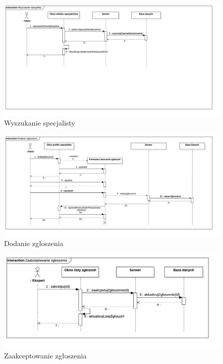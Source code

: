 \documentclass[10pt, titlepage, oneside, a4paper]{article}
\begin{document}
	\begin{figure}[h]
		\centering
		\includegraphics[width=0.9\textwidth{}]{Wyszukanie_specjalisty.png}
		\caption{Wyszukanie specjalisty}
		\label{fig:sequenceDiagramSearchForExpert}
	\end{figure}

	\begin{figure}[h]
		\centering
		\includegraphics[width=0.9\textwidth{}]{Dodanie_zgloszenia.png}
		\caption{Dodanie zgłoszenia}
		\label{fig:sequenceDiagramAddRequest}
	\end{figure}

	\begin{figure}[h]
		\centering
		\includegraphics[width=0.9\textwidth{}]{Zaakceptowanie_zgloszenia.png}
		\caption{Zaakceptowanie zgłoszenia}
		\label{fig:sequenceDiagramAcceptRequest}
	\end{figure}
\end{document}
